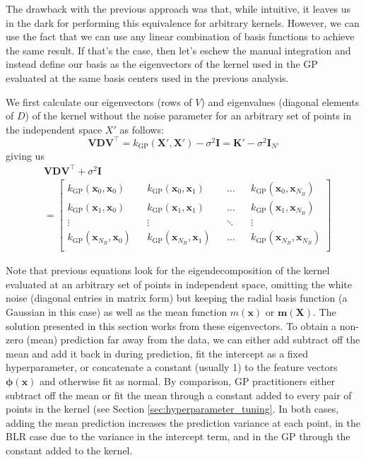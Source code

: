 \documentclass{article}
\begin{document}
The drawback with the previous approach was that, while intuitive, it leaves us in the dark for performing this equivalence for arbitrary kernels. However, we can use the fact that we can use any linear combination of basis functions to achieve the same result. If that's the case, then let's eschew the manual integration and instead define our basis as the eigenvectors of the kernel used in the GP evaluated at the same basis centers used in the previous analysis.

We first calculate our eigenvectors (rows of $V$) and eigenvalues (diagonal elements of $D$) of the kernel without the noise parameter for an arbitrary set of points in the independent space $X'$ as follows:
\begin{equation}
 \mathbf{VDV}^\top=k_\text{GP}(\mathbf{X}',\mathbf{X}')-\sigma^2 \mathbf{I}=\mathbf{K}'-\sigma^2 \mathbf{I}_{N'}
\end{equation}giving us\begin{equation}
\begin{split}
\label{VDV}
    &\mathbf{VDV}^\top+\sigma^2 \mathbf{I} \\&= 
    \begin{bmatrix}
    k_\text{GP}(\mathbf{x}_0,\mathbf{x}_0) && k_\text{GP}(\mathbf{x}_0,\mathbf{x}_1) && \dots && k_\text{GP}(\mathbf{x}_0,\mathbf{x}_{N_B}) \\
    k_\text{GP}(\mathbf{x}_1,\mathbf{x}_0) && k_\text{GP}(\mathbf{x}_1,\mathbf{x}_1) && \dots && k_\text{GP}(\mathbf{x}_1,\mathbf{x}_{N_B}) \\
    \vdots && \vdots && \ddots && \vdots \\
    k_\text{GP}(\mathbf{x}_{N_B},\mathbf{x}_0) && k_\text{GP}(\mathbf{x}_{N_B},\mathbf{x}_1) && \dots && k_\text{GP}(\mathbf{x}_{N_B},\mathbf{x}_{N_B}) \\
    \end{bmatrix}
    \end{split}
\end{equation}

Note that previous equations look for the eigendecomposition of the kernel evaluated at an arbitrary set of points in independent space, omitting the white noise (diagonal entries in matrix form) but keeping the radial basis function (a Gaussian in this case) as well as the mean function $m(\mathbf{x})$ or $\mathbf{m}(\mathbf{X})$. The solution presented in this section works from these eigenvectors. To obtain a non-zero (mean) prediction far away from the data, we can either add subtract off the mean and add it back in during prediction, fit the intercept as a fixed hyperparameter, or concatenate a constant (usually 1) to the feature vectors $\boldsymbol{\phi}(\mathbf{x})$ and otherwise fit as normal. By comparison, GP practitioners either subtract off the mean or fit the mean through a constant added to every pair of points in the kernel (see Section \ref{sec:hyperparameter_tuning}. In both cases, adding the mean prediction increases the prediction variance at each point, in the BLR case due to the variance in the intercept term, and in the GP through the constant added to the kernel.
\end{document}
